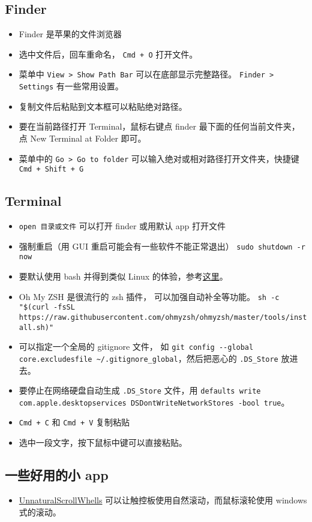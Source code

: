 \subsection{Finder}
\begin{itemize}
\item Finder 是苹果的文件浏览器
\item 选中文件后，回车重命名， \verb`Cmd + O` 打开文件。
\item 菜单中 \verb|View > Show Path Bar| 可以在底部显示完整路径。 \verb`Finder > Settings` 有一些常用设置。
\item 复制文件后粘贴到文本框可以粘贴绝对路径。
\item 要在当前路径打开 Terminal，鼠标右键点 finder 最下面的任何当前文件夹，点 New Terminal at Folder 即可。
\item 菜单中的 \verb`Go > Go to folder` 可以输入绝对或相对路径打开文件夹，快捷键 \verb`Cmd + Shift + G`
\end{itemize}

\subsection{Terminal}
\begin{itemize}
\item \verb`open 目录或文件` 可以打开 finder 或用默认 app 打开文件
\item 强制重启（用 GUI 重启可能会有一些软件不能正常退出） \verb|sudo shutdown -r now|
\item 要默认使用 bash 并得到类似 Linux 的体验，参考\href{https://medium.com/@geraldcroes/the-good-tweak-the-bad-mac-and-the-ugly-terminal-8f18b3c3d687}{这里}。
\item Oh My ZSH 是很流行的 zsh 插件， 可以加强自动补全等功能。 \verb`sh -c "$(curl -fsSL https://raw.githubusercontent.com/ohmyzsh/ohmyzsh/master/tools/install.sh)"`
\item 可以指定一个全局的 gitignore 文件， 如 \verb|git config --global core.excludesfile ~/.gitignore_global|，然后把恶心的 \verb`.DS_Store` 放进去。
\item 要停止在网络硬盘自动生成 \verb`.DS_Store` 文件，用 \verb`defaults write com.apple.desktopservices DSDontWriteNetworkStores -bool true`。
\item \verb`Cmd + C` 和 \verb`Cmd + V` 复制粘贴
\item 选中一段文字，按下鼠标中键可以直接粘贴。
\end{itemize}

\subsection{一些好用的小 app}
\begin{itemize}
\item \href{https://github.com/ther0n/UnnaturalScrollWheels}{UnnaturalScrollWhells} 可以让触控板使用自然滚动，而鼠标滚轮使用 windows 式的滚动。
\end{itemize}

